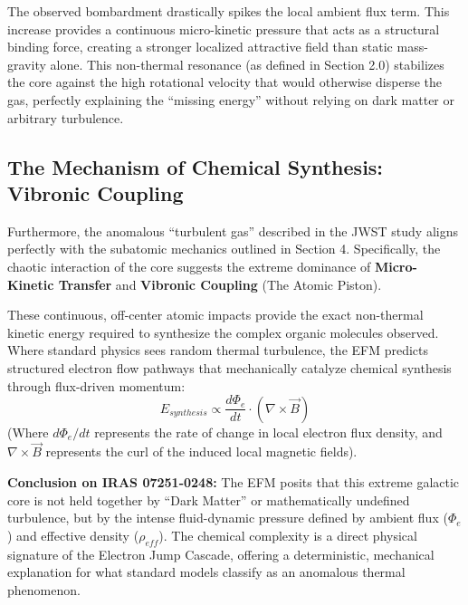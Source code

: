 \documentclass[11pt, a4paper]{article}
\begin{document}
  The observed bombardment drastically spikes the local ambient flux term. This increase provides a continuous micro-kinetic pressure that acts as a structural binding force, creating a stronger localized attractive field than static mass-gravity alone. This non-thermal resonance (as defined in Section 2.0) stabilizes the core against the high rotational velocity that would otherwise disperse the gas, perfectly explaining the ``missing energy'' without relying on dark matter or arbitrary turbulence.

\subsection{The Mechanism of Chemical Synthesis: Vibronic Coupling}
Furthermore, the anomalous ``turbulent gas'' described in the JWST study aligns perfectly with the subatomic mechanics outlined in Section 4. Specifically, the chaotic interaction of the core suggests the extreme dominance of \textbf{Micro-Kinetic Transfer} and \textbf{Vibronic Coupling} (The Atomic Piston).

These continuous, off-center atomic impacts provide the exact non-thermal kinetic energy required to synthesize the complex organic molecules observed. Where standard physics sees random thermal turbulence, the EFM predicts structured electron flow pathways that mechanically catalyze chemical synthesis through flux-driven momentum:
\begin{equation}
  E_{synthesis} \propto \frac{d\Phi_e}{dt} \cdot (\nabla \times \vec{B})
\end{equation}
(Where $d\Phi_e/dt$ represents the rate of change in local electron flux density, and $\nabla \times \vec{B}$ represents the curl of the induced local magnetic fields).

\textbf{Conclusion on IRAS 07251-0248:}
The EFM posits that this extreme galactic core is not held together by ``Dark Matter'' or mathematically undefined turbulence, but by the intense fluid-dynamic pressure defined by ambient flux ($\Phi_e$) and effective density ($\rho_{eff}$). The chemical complexity is a direct physical signature of the Electron Jump Cascade, offering a deterministic, mechanical explanation for what standard models classify as an anomalous thermal phenomenon.

\clearpage
\end{document}
